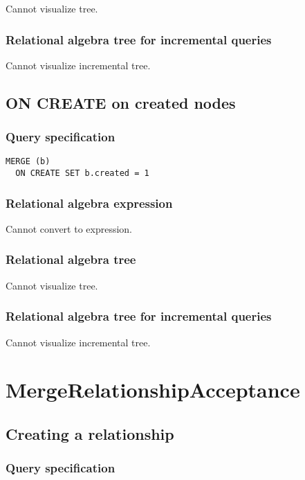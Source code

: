 Cannot visualize tree.

\subsubsection*{Relational algebra tree for incremental queries}

Cannot visualize incremental tree.

\subsection{ON CREATE on created nodes}

\subsubsection*{Query specification}

\begin{lstlisting}
MERGE (b)
  ON CREATE SET b.created = 1
\end{lstlisting}

\subsubsection*{Relational algebra expression}

Cannot convert to expression.

\subsubsection*{Relational algebra tree}

Cannot visualize tree.

\subsubsection*{Relational algebra tree for incremental queries}

Cannot visualize incremental tree.

\section{MergeRelationshipAcceptance}

\subsection{Creating a relationship}

\subsubsection*{Query specification}

